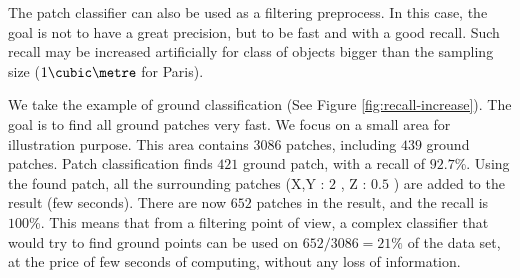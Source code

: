 
		The patch classifier can also be used as a filtering preprocess.
		In this case, the goal is not to have a great precision, but to be fast and with a good recall.
		Such recall may be increased artificially for class of objects bigger than the sampling size ($1\cubic\metre$ for Paris).
		
		We take the example of ground classification (See Figure \ref{fig:recall-increase}). 
		The goal is to find all ground patches very fast.
		We focus on a small area for illustration purpose. This area contains $3086$ patches, including $439$ ground patches.
		Patch classification finds $421$ ground patch, 
		with a recall of $92.7$\%.
		Using the found patch, all the surrounding patches (X,Y : $2$ \meter, Z : $0.5$ \meter ) are added to the result (few seconds).
		There are now $652$ patches in the result, and the recall is $100$\%.
		This means that from a filtering point of view, a complex classifier that would try to find ground points can be used on $652/3086=21\%$ of the data set, at the price of few seconds of computing, without any loss of information.
		
		
					 	  